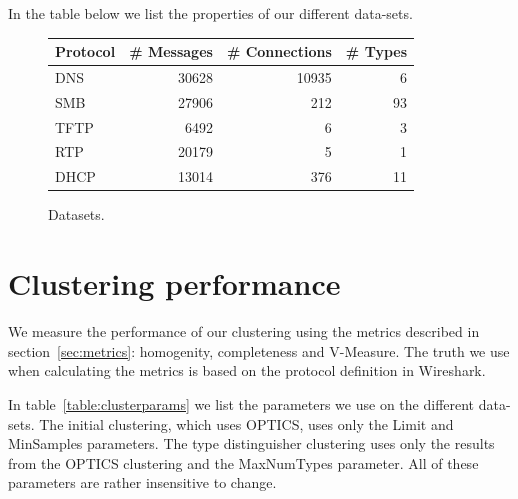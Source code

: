 \documentclass[a4paper]{report}
\begin{document}
In the table below we list the properties of our different data-sets.






\begin{figure}[h]
    \centering
    \begin{tabular}{| l | r | r | r |}
        \hline
        \textbf{Protocol}&\textbf{\# Messages}&\textbf{\# Connections}&\textbf{\# Types}\\ \hline
        DNS         & 30628         & 10935         & 6         \\ \hline
        SMB         & 27906         & 212           & 93        \\ \hline
        TFTP        & 6492          & 6             & 3         \\ \hline
        RTP         & 20179         & 5             & 1         \\ \hline
        DHCP        & 13014         & 376           & 11        \\ \hline
    \end{tabular}
    \caption{Datasets.}
\end{figure}

\section{Clustering performance}
We measure the performance of our clustering using the metrics described in
section~\ref{sec:metrics}: homogenity, completeness and V-Measure. The truth we
use when calculating the metrics is based on the protocol definition in
Wireshark.

In table~\ref{table:clusterparams} we list the parameters we use on the
different data-sets. The initial clustering, which uses OPTICS, uses only the
Limit and MinSamples parameters. The type distinguisher clustering uses only
the results from the OPTICS clustering and the MaxNumTypes parameter. All of
these parameters are rather insensitive to change.
\end{document}
